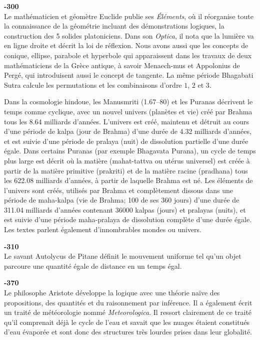 \textbf{-300}\\
Le mathématicien et géomètre Euclide publie ses \textit{Éléments}, où il réorganise toute la connaissance de la géométrie incluant des démonstrations logiques, la construction des 5 solides platoniciens. Dans son \textit{Optica}, il nota que la lumière va en ligne droite et décrit la loi de réflexion. Nous avons aussi que les concepts de conique, ellipse, parabole et hyperbole qui apparaissent dans les travaux de deux mathématiciens de la Grèce antique, à savoir Menaech-mus et Appolonius de Pergé, qui introduisent aussi le concept de tangente. La même période Bhagabati Sutra calcule les permutations et les combinaisons d'ordre $1$, $2$ et $3$.

Dans la cosmologie hindoue, les Manusmriti (1.67–80) et les Puranas décrivent le temps comme cyclique, avec un nouvel univers (planètes et vie) créé par Brahma tous les 8.64 milliards d'années. L'univers est créé, maintenu et détruit au cours d'une période de kalpa (jour de Brahma) d'une durée de 4.32 milliards d'années, et est suivie d'une période de pralaya (nuit) de dissolution partielle d'une durée égale. Dans certains Puranas (par exemple Bhagavata Purana), un cycle de temps plus large est décrit où la matière (mahat-tattva ou utérus universel) est créée à partir de la matière primitive (prakriti) et de la matière racine (pradhana) tous les 622.08 milliards d'années, à partir de laquelle Brahma est né. Les éléments de l'univers sont créés, utilisés par Brahma et complètement dissous dans une période de maha-kalpa (vie de Brahma; 100 de ses 360 jours) d'une durée de 311.04 milliards d'années contenant 36000 kalpas (jours) et pralayas (nuits), et est suivie d'une période maha-pralaya de dissolution complète d'une durée égale. Les textes parlent également d'innombrables mondes ou univers.

\textbf{-310}\\
Le savant Autolycus de Pitane définit le mouvement uniforme tel qu'un objet parcoure une quantité égale de distance en un temps égal.

\textbf{-370}\\
Le philosophe Aristote développe la logique avec une théorie naïve des propositions, des quantités et du raisonnement par inférence. Il a également écrit un traité de météorologie nommé \textit{Meteorologica}. Il ressort clairement de ce traité qu'il comprenait déjà le cycle de l'eau et savait que les nuages étaient constitués d'eau évaporée et sont donc des structures très lourdes prises dans leur globalité.

